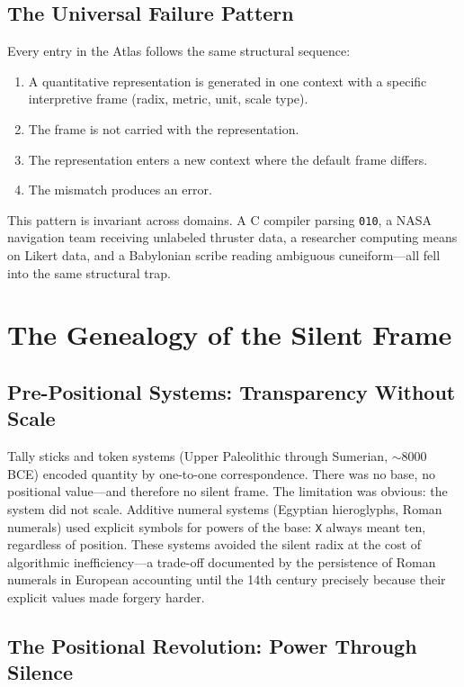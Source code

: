 \documentclass[12pt,a4paper]{article}
\theoremstyle{definition}
\theoremstyle{remark}
\begin{document}
\subsection{The Universal Failure Pattern}

Every entry in the Atlas follows the same structural sequence:

\begin{enumerate}[nosep]
    \item A quantitative representation is generated in one context with a specific interpretive frame (radix, metric, unit, scale type).
    \item The frame is not carried with the representation.
    \item The representation enters a new context where the default frame differs.
    \item The mismatch produces an error.
\end{enumerate}

This pattern is invariant across domains. A C compiler parsing \texttt{010}, a NASA navigation team receiving unlabeled thruster data, a researcher computing means on Likert data, and a Babylonian scribe reading ambiguous cuneiform---all fell into the same structural trap.

\section{The Genealogy of the Silent Frame}

\subsection{Pre-Positional Systems: Transparency Without Scale}

Tally sticks and token systems (Upper Paleolithic through Sumerian, $\sim$8000 BCE) encoded quantity by one-to-one correspondence. There was no base, no positional value---and therefore no silent frame. The limitation was obvious: the system did not scale. Additive numeral systems (Egyptian hieroglyphs, Roman numerals) used explicit symbols for powers of the base: \texttt{X} always meant ten, regardless of position. These systems avoided the silent radix at the cost of algorithmic inefficiency---a trade-off documented by the persistence of Roman numerals in European accounting until the 14th century precisely because their explicit values made forgery harder.

\subsection{The Positional Revolution: Power Through Silence}
\end{document}
